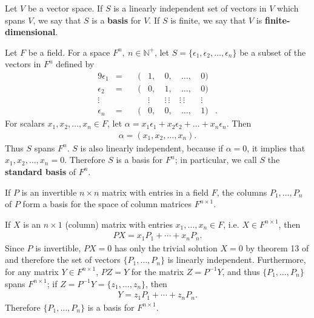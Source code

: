 \documentclass[12pt]{article}
\begin{document}
\begin{defn}
  Let $V$ be a vector space. If $S$ is a linearly independent set of vectors in $V$
  which spans $V$, we say that $S$ is a \textbf{basis} for $V$. If $S$ is finite, we
  say that $V$ is \textbf{finite-dimensional}.

  Let $F$ be a field. For a space $F^n,\ n \in \mathbb{N}^+$, let $S =
  \{\epsilon_1,\epsilon_2,\ldots,\epsilon_n\}$ be a subset of the vectors in $F^n$
  defined by
  \begin{alignat*}{9}
    \epsilon_1 &=&\ &(&1,&\ 0,&\ \ldots,&\ 0)&\\
    \epsilon_2 &=&\ &(&0,&\ 1,&\ \ldots,&\ 0)&\\
    \vdots & &\ & &\vdots &\ \vdots\ \vdots&\vdots\ \vdots &\ \vdots &\\
    \epsilon_n &=&\ &(&0,&\ 0,&\ \ldots,&\ 1)&.
  \end{alignat*}
  For scalars $x_1,x_2,\ldots,x_n \in F$, let $\alpha = x_1\epsilon_1 + x_2\epsilon_2
  + \ldots + x_n\epsilon_n$. Then
  \begin{align*}
    \alpha = (x_1,x_2,\ldots,x_n).
  \end{align*}
  Thus $S$ spans $F^n$. $S$ is also linearly independent, because if $\alpha = 0$, it
  implies that $x_1,x_2,\ldots,x_n = 0$. Therefore $S$ is a basis for $F^n$; in
  particular, we call $S$ the \textbf{standard basis} of $F^n$.
\end{defn}

\begin{exm}
  If $P$ is an invertible $n \times n$ matrix with entries in a field $F$, the
  columns $P_1,\ldots,P_n$ of $P$ form a basis for the space of column matrices $F^{n
  \times 1}$.

  If $X$ is an $n \times 1$ (column) matrix with entries $x_1,\ldots,x_n \in F$, i.e.
  $X \in F^{n \times 1}$, then
  \begin{align*}
    PX = x_1P_1 + \cdots + x_nP_n.
  \end{align*}
  Since $P$ is invertible, $PX = 0$ has only the trivial solution $X = 0$ by theorem
  13 of  and therefore the set of vectors $\{P_1,\ldots,P_n\}$ is
  linearly independent. Furthermore, for any matrix $Y \in F^{n \times 1}$, $PZ = Y$
  for the matrix $Z = P^{-1}Y$, and thus $\{P_1,\ldots,P_n\}$ spans $F^{n \times 1}$;
  if $Z = P^{-1}Y = \{z_1,\ldots,z_n\}$, then
  \begin{align*}
    Y = z_1P_1 + \cdots + z_nP_n.
  \end{align*}
  Therefore $\{P_1,\ldots,P_n\}$ is a basis for $F^{n \times 1}$.
\end{exm}
\end{document}
